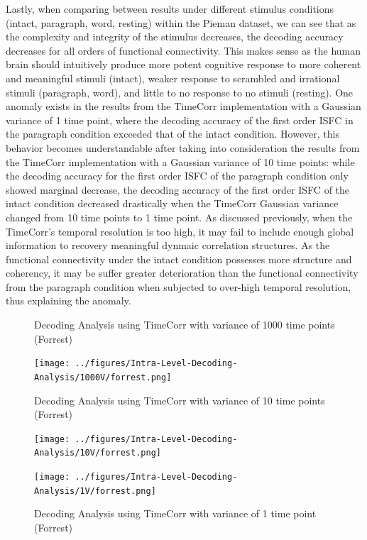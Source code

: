 \documentclass[11pt]{article}
\begin{document}
Lastly, when comparing between results under different stimulus conditions (intact, paragraph, word, resting) within the Pieman dataset, we can see that as the complexity and integrity of the stimulus decreases, the decoding accuracy decreases for all orders of functional connectivity. This makes sense as the human brain should intuitively produce more potent cognitive response to more coherent and meaningful stimuli (intact), weaker response to scrambled and irrational stimuli (paragraph, word), and little to no response to no stimuli (resting). One anomaly exists in the results from the TimeCorr implementation with a Gaussian variance of 1 time point, where the decoding accuracy of the first order ISFC in the paragraph condition exceeded that of the intact condition. However, this behavior becomes understandable after taking into consideration the results from the TimeCorr implementation with a Gaussian variance of 10 time points: while the decoding accuracy for the first order ISFC of the paragraph condition only showed marginal decrease, the decoding accuracy of the first order ISFC of the intact condition decreased drastically when the TimeCorr Gaussian variance changed from 10 time points to 1 time point. As discussed previously, when the TimeCorr's temporal resolution is too high, it may fail to include enough global information to recovery meaningful dynmaic correlation structures. As the functional connectivity under the intact condition possesses more structure and coherency, it may be suffer greater deterioration than the functional connectivity from the paragraph condition when subjected to over-high temporal resolution, thus explaining the anomaly.

\begin{figure}[!htb]
\caption{Decoding Analysis using TimeCorr with variance of 1000 time points (Forrest)}
\centering
\texttt{[image: ../figures/Intra-Level-Decoding-Analysis/1000V/forrest.png]}
\label{fig:forrestDC1000}
\caption{Decoding Analysis using TimeCorr with variance of 10 time points (Forrest)}
\centering
\texttt{[image: ../figures/Intra-Level-Decoding-Analysis/10V/forrest.png]}
\label{fig:forrestDC10}
\caption{Decoding Analysis using TimeCorr with variance of 1 time point (Forrest)}
\centering
\texttt{[image: ../figures/Intra-Level-Decoding-Analysis/1V/forrest.png]}
\label{fig:forrestDC1}
\end{figure}
\end{document}
